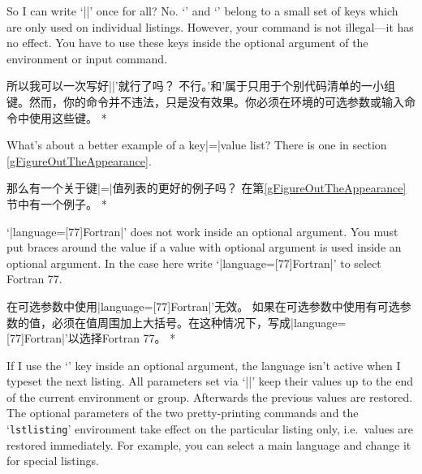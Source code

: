 \begin{advise}
    \begin{paracol}{2}
\item So I can write `|\lstset{firstline=2,lastline=5}|' once for all?
      \advisespace
      No. `' and `' belong to a small
      set of
      keys which are only used on individual listings. However, your command is
      not illegal---it has no effect. You have to use these keys inside the
      optional argument of the environment or input command.
      \switchcolumn
      \item 所以我可以一次写好|\lstset{firstline=2,lastline=5}|'就行了吗？ \advisespace 不行。'和'属于只用于个别代码清单的一小组键。然而，你的命令并不违法，只是没有效果。你必须在环境的可选参数或输入命令中使用这些键。
      \switchcolumn[0]*%
\item What's about a better example of a key|=|value list?
      \advisespace
      There is one in section \ref{gFigureOutTheAppearance}.
      \switchcolumn
      \item 那么有一个关于键|=|值列表的更好的例子吗？ \advisespace 在第\ref{gFigureOutTheAppearance}节中有一个例子。
\switchcolumn[0]*%
\item `|language=[77]Fortran|' does not work inside an optional argument.
      \advisespace
      You must put braces around the value if a value with optional argument
      is used inside an optional argument. In the case here write
      `|language={[77]Fortran}|' to select Fortran 77.
      \switchcolumn
      \item 在可选参数中使用|language=[77]Fortran|'无效。
      \advisespace
      如果在可选参数中使用有可选参数的值，必须在值周围加上大括号。在这种情况下，写成|language={[77]Fortran}|'以选择Fortran 77。
\switchcolumn[0]*%
\item If I use the `' key inside an optional argument, the
      language isn't active when I typeset the next listing.
      \advisespace
      All parameters set via `|\lstset|' keep their values up to the end of
      the current environment or group. Afterwards the previous values are
      restored. The optional parameters of the two pretty-printing commands
      and the `\texttt{lstlisting}' environment take effect on the particular
      listing only, i.e.~values are restored immediately. For example, you
      can select a main language and change it for special listings.
      \switchcolumn

\end{paracol}
\end{advise}
